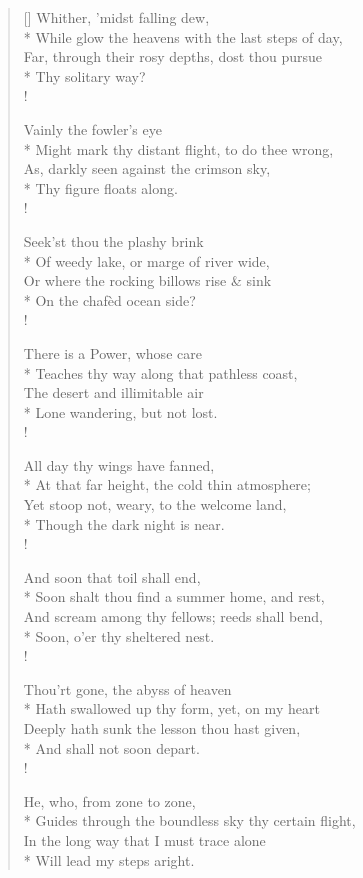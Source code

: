 \documentclass[MAIN]{subfiles}
\begin{document}
\settowidth{\versewidth}{While glow the heavens with the last steps of day,}
\begin{verse}[\versewidth]
\vin Whither, 'midst falling dew,\\*
While glow the heavens with the last steps of day,\\
Far, through their rosy depths, dost thou pursue\\*
\vin Thy solitary way?\\!

\vin Vainly the fowler's eye\\*
Might mark thy distant flight, to do thee wrong,\\
As, darkly seen against the crimson sky,\\*
\vin Thy figure floats along.\\!

\vin Seek'st thou the plashy brink\\*
Of weedy lake, or marge of river wide,\\
Or where the rocking billows rise \& sink\\*
\vin On the chaf\`ed ocean side?\\! 

\vin There is a Power, whose care\\*
Teaches thy way along that pathless coast,\\
The desert and illimitable air\\*
\vin Lone wandering, but not lost.\\!

\vin All day thy wings have fanned,\\*
At that far height, the cold thin atmosphere;\\
Yet stoop not, weary, to the welcome land,\\*
\vin Though the dark night is near.\\!

\vin And soon that toil shall end,\\*
Soon shalt thou find a summer home, and rest,\\
And scream among thy fellows; reeds shall bend,\\*
\vin Soon, o'er thy sheltered nest.\\!

\vin Thou'rt gone, the abyss of heaven\\*
Hath swallowed up thy form, yet, on my heart\\
Deeply hath sunk the lesson thou hast given,\\*
\vin And shall not soon depart.\\!

\vin He, who, from zone to zone,\\*
Guides through the boundless sky thy certain flight,\\
In the long way that I must trace alone\\*
\vin Will lead my steps aright. 
\end{verse}
\end{document}
